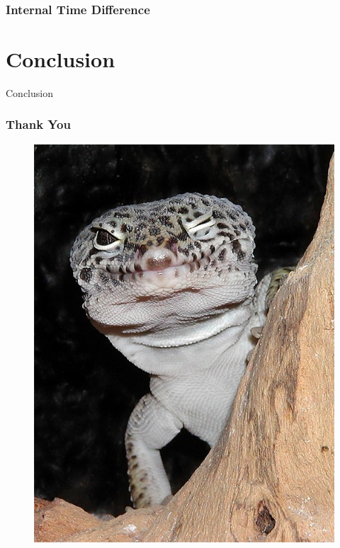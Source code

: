 \documentclass{beamer}
\begin{document}
\subsubsection{Internal Time Difference}

\section{Conclusion}
\begin{frame}[t]
 Conclusion
\end{frame}

\begin{frame}[t]
 \frametitle{Thank You}
 \begin{figure}
  \centering
  \includegraphics[width=.3\textwidth]{Diagrams/geckowink.jpg}
 \end{figure}
\end{frame}
\end{document}
